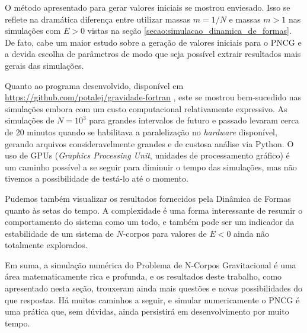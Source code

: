 O método apresentado para gerar valores iniciais se mostrou enviesado. Isso se reflete na dramática diferença entre utilizar massas $m=1/N$ e massas $m>1$ nas simulações com $E>0$ vistas na seção \ref{secao:simulacao_dinamica_de_formas}. De fato, cabe um maior estudo sobre a geração de valores iniciais para o PNCG e a devida escolha de parâmetros de modo que seja possível extrair resultados mais gerais das simulações.

Quanto ao programa desenvolvido, disponível em \href{https://github.com/potalej/gravidade-fortran}{https://github.com/potalej/gravidade-fortran} \citep{potalej_gravidade-fortran}, este se mostrou bem-sucedido nas simulações embora com um custo computacional relativamente expressivo. As simulações de $N=10^3$ para grandes intervalos de futuro e passado levaram cerca de 20 minutos quando se habilitava a paralelização no \textit{hardware} disponível, gerando arquivos consideravelmente grandes e de custosa análise via Python. O uso de GPUs (\textit{Graphics Processing Unit}, unidades de processamento gráfico) é um caminho possível a se seguir para diminuir o tempo das simulações, mas não tivemos a possibilidade de testá-lo até o momento.

Pudemos também visualizar os resultados fornecidos pela Dinâmica de Formas quanto às setas do tempo. A complexidade é uma forma interessante de resumir o comportamento do sistema como um todo, e também pode ser um indicador da estabilidade de um sistema de $N$-corpos para valores de $E < 0$ ainda não totalmente explorados.

Em suma, a simulação numérica do Problema de N-Corpos Gravitacional é uma área matematicamente rica e profunda, e os resultados deste trabalho, como apresentado nesta seção, trouxeram ainda mais questões e novas possibilidades do que respostas. Há muitos caminhos a seguir, e simular numericamente o PNCG é uma prática que, sem dúvidas, ainda persistirá em desenvolvimento por muito tempo. 